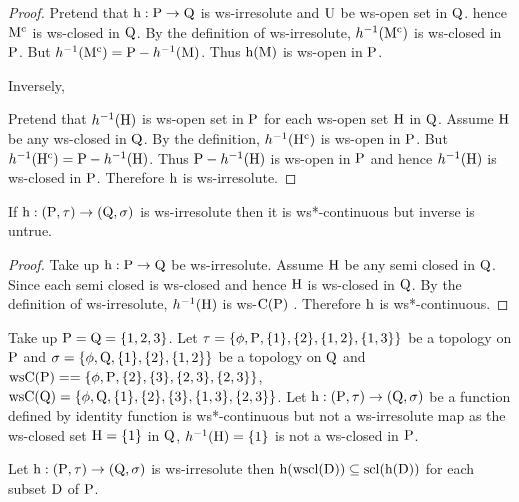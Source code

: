 \begin{proof}
Pretend that $\mathrm{h}: \mathrm{P}\to \mathrm{Q}$ is ws-irresolute and $\mathrm{U}$ be ws-open set in $\mathrm{Q}$. hence $\mathrm{M}^{\text{c}}$ is ws-closed in $\mathrm{Q}$. By the definition of ws-irresolute, $h^{-1}(\mathrm{M}^{\text{c}})$ is ws-closed in $\mathrm{P}$. But $h^{-1} (\mathrm{M}^{\text{c}})= \mathrm{P} -h^{-1}(\mathrm{M})$. Thus $\mathrm{h} (\mathrm{M})$ is ws-open in $\mathrm{P}$.

Inversely,

Pretend that $h^{-1}(\mathrm{H})$ is ws-open set in $\mathrm{P}$ for each ws-open set $\mathrm{H}$ in $\mathrm{Q}$. Assume $\mathrm{H}$ be any ws-closed in $\mathrm{Q}$. By the definition, $h^{-1} (\mathrm{H}^{\text{c}})$ is ws-open in $\mathrm{P}$. But $h^{-1}(\mathrm{H}^{\text{c}})= \mathrm{P} -h^{-1} (\mathrm{H})$. Thus $\mathrm{P}-h^{-1} (\mathrm{H})$ is ws-open in $\mathrm{P}$ and hence $h^{-1}(\mathrm{H})$ is ws-closed in $\mathrm{P}$. Therefore $\mathrm{h}$ is ws-irresolute.
\end{proof}

\begin{thm}\label{thm3.3.6}
If $\mathrm{h}: (\mathrm{P},\tau ) \to (\mathrm{Q}, \sigma)$ is ws-irresolute then it is ws*-continuous but inverse is untrue.
\end{thm}

\begin{proof}
Take up $\mathrm{h}: \mathrm{P}\to \mathrm{Q}$ be ws-irresolute. Assume $\mathrm{H}$ be any semi closed in $\mathrm{Q}$. Since each semi closed is ws-closed and hence $\mathrm{H}$ is ws-closed in $\mathrm{Q}$. By the definition of ws-irresolute, $h^{-1}(\mathrm{H})$ is ws-$\mathrm{C}(\mathrm{P})$ . Therefore $\mathrm{h}$ is ws*-continuous.
\end{proof}

\begin{exm}\label{exam3.3.7}
Take up $\mathrm{P}=\mathrm{Q}= \{1, 2, 3\}$. Let $\tau =\{\phi, \mathrm{P}, \{1\}, \{2\}, \{1, 2\}, \{1, 3\}\}$ be a topology on $\mathrm{P}$ and $\sigma =\{\phi, \mathrm{Q}, \{1\}, \{2\}, \{1, 2\}\}$ be a topology on $\mathrm{Q}$ and $\mathrm{ws}\mathrm{C}(\mathrm{P})= =\{\phi, \mathrm{P}, \{2\},\{3\}, \{2, 3\},\{2, 3\}\}$, $\mathrm{ws}\mathrm{C}(\mathrm{Q})= \{\phi, \mathrm{Q}, \{1\}, \{2\},\{3\}, \{1, 3\},\{2, 3\}\}$. Let $\mathrm{h}: (\mathrm{P}, \tau )\to (\mathrm{Q}, \sigma)$ be a function defined by identity function is ws*-continuous but not a ws-irresolute map as the ws-closed set $\mathrm{H}=\{1\}$ in $\mathrm{Q}$, $h^{-1}(\mathrm{H})=\{1\}$ is not a ws-closed in $\mathrm{P}$.
\end{exm}

\begin{thm}\label{thm3.3.8}
Let $\mathrm{h}: (\mathrm{P},\tau )\to (\mathrm{Q}, \sigma)$ is ws-irresolute then $\mathrm{h}(\mathrm{wscl}(\mathrm{D})) \subseteq \mathrm{scl}(\mathrm{h}(\mathrm{D}))$ for each subset $\mathrm{D}$ of $\mathrm{P}$.
\end{thm}

